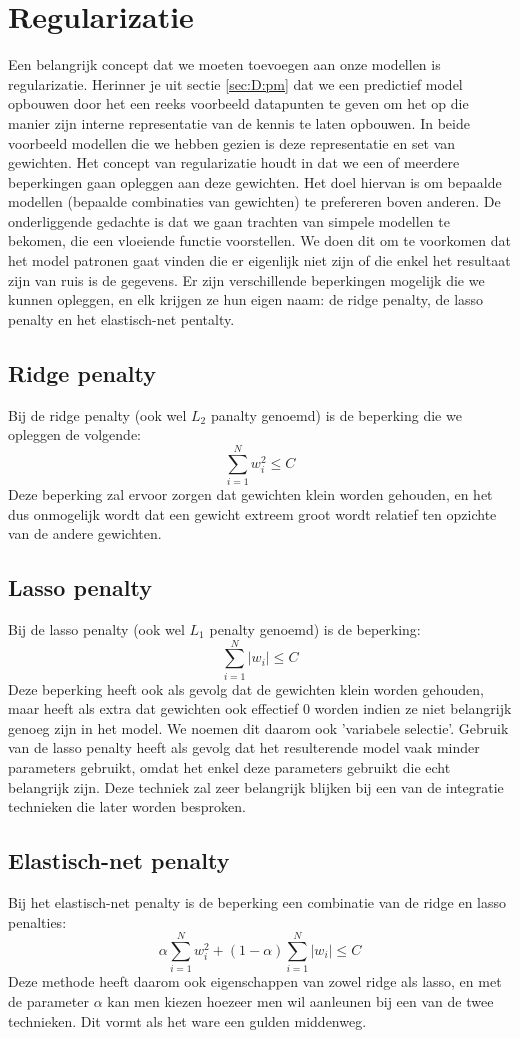 \section{Regularizatie}
Een belangrijk concept dat we moeten toevoegen aan onze modellen is regularizatie. Herinner je uit sectie \ref{sec:D:pm} dat we een predictief model opbouwen door het een reeks voorbeeld datapunten te geven om het op die manier zijn interne representatie van de kennis te laten opbouwen. In beide voorbeeld modellen die we hebben gezien is deze representatie en set van gewichten. Het concept van regularizatie houdt in dat we een of meerdere beperkingen gaan opleggen aan deze gewichten. Het doel hiervan is om bepaalde modellen (bepaalde combinaties van gewichten) te prefereren boven anderen. De onderliggende gedachte is dat we gaan trachten van simpele modellen te bekomen, die een vloeiende functie voorstellen. We doen dit om te voorkomen dat het model patronen gaat vinden die er eigenlijk niet zijn of die enkel het resultaat zijn van ruis is de gegevens. Er zijn verschillende beperkingen mogelijk die we kunnen opleggen, en elk krijgen ze hun eigen naam: de ridge penalty, de lasso penalty en het elastisch-net pentalty.
\subsection{Ridge penalty}
Bij de ridge penalty (ook wel $L_{2}$ panalty genoemd) is de beperking die we opleggen de volgende:
$$
\sum_{i=1}^{N}w_{i}^{2} \leq C
$$
Deze beperking zal ervoor zorgen dat gewichten klein worden gehouden, en het dus onmogelijk wordt dat een gewicht extreem groot wordt relatief ten opzichte van de andere gewichten.
\subsection{Lasso penalty}
Bij de lasso penalty (ook wel $L_{1}$ penalty genoemd) is de beperking:
$$
\sum_{i=1}^{N}\lvert w_{i}\rvert \leq C
$$
Deze beperking heeft ook als gevolg dat de gewichten klein worden gehouden, maar heeft als extra dat gewichten ook effectief 0 worden indien ze niet belangrijk genoeg zijn in het model. We noemen dit daarom ook 'variabele selectie'. Gebruik van de lasso penalty heeft als gevolg dat het resulterende model vaak minder parameters gebruikt, omdat het enkel deze parameters gebruikt die echt belangrijk zijn. Deze techniek zal zeer belangrijk blijken bij een van de integratie technieken die later worden besproken.
\subsection{Elastisch-net penalty}
Bij het elastisch-net penalty is de beperking een combinatie van de ridge en lasso penalties:
$$
\alpha \sum_{i=1}^{N}w_{i}^{2} + (1-\alpha)\sum_{i=1}^{N}\lvert w_{i}\rvert \leq C
$$
Deze methode heeft daarom ook eigenschappen van zowel ridge als lasso, en met de parameter $\alpha$ kan men kiezen hoezeer men wil aanleunen bij een van de twee technieken. Dit vormt als het ware een gulden middenweg.
